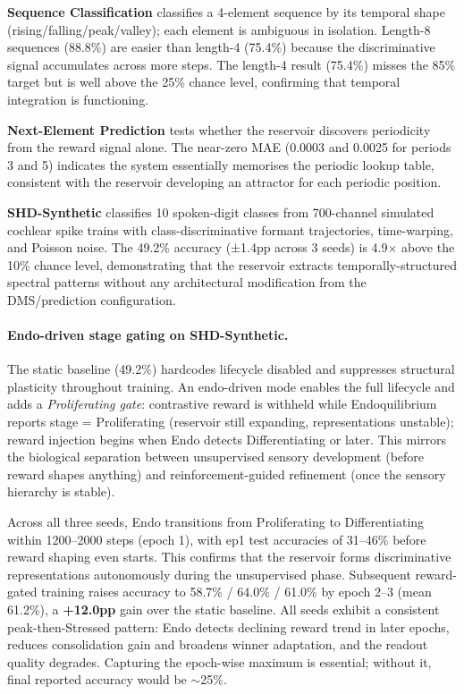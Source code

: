 \textbf{Sequence Classification} classifies a 4-element sequence by its temporal shape (rising/falling/peak/valley); each element is ambiguous in isolation. Length-8 sequences (88.8\%) are easier than length-4 (75.4\%) because the discriminative signal accumulates across more steps. The length-4 result (75.4\%) misses the 85\% target but is well above the 25\% chance level, confirming that temporal integration is functioning.

\textbf{Next-Element Prediction} tests whether the reservoir discovers periodicity from the reward signal alone. The near-zero MAE (0.0003 and 0.0025 for periods 3 and 5) indicates the system essentially memorises the periodic lookup table, consistent with the reservoir developing an attractor for each periodic position.

\textbf{SHD-Synthetic} classifies 10 spoken-digit classes from 700-channel simulated cochlear spike trains with class-discriminative formant trajectories, time-warping, and Poisson noise. The 49.2\% accuracy (±1.4pp across 3 seeds) is 4.9$\times$ above the 10\% chance level, demonstrating that the reservoir extracts temporally-structured spectral patterns without any architectural modification from the DMS/prediction configuration.

\paragraph{Endo-driven stage gating on SHD-Synthetic.}
\label{sec:endo_stage_gating}
The static baseline (49.2\%) hardcodes lifecycle disabled and suppresses structural plasticity throughout training. An endo-driven mode enables the full lifecycle and adds a \emph{Proliferating gate}: contrastive reward is withheld while Endoquilibrium reports stage = Proliferating (reservoir still expanding, representations unstable); reward injection begins when Endo detects Differentiating or later. This mirrors the biological separation between unsupervised sensory development (before reward shapes anything) and reinforcement-guided refinement (once the sensory hierarchy is stable).

Across all three seeds, Endo transitions from Proliferating to Differentiating within 1200--2000 steps (epoch 1), with ep1 test accuracies of 31--46\% before reward shaping even starts. This confirms that the reservoir forms discriminative representations autonomously during the unsupervised phase. Subsequent reward-gated training raises accuracy to 58.7\% / 64.0\% / 61.0\% by epoch 2--3 (mean 61.2\%), a \textbf{+12.0pp} gain over the static baseline. All seeds exhibit a consistent peak-then-Stressed pattern: Endo detects declining reward trend in later epochs, reduces consolidation gain and broadens winner adaptation, and the readout quality degrades. Capturing the epoch-wise maximum is essential; without it, final reported accuracy would be $\sim$25\%.

